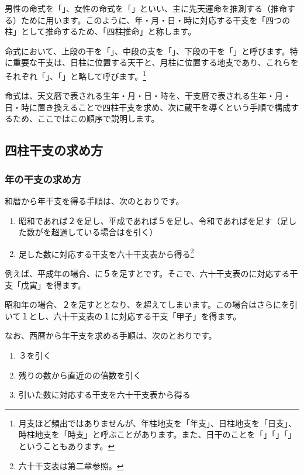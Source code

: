 \documentclass[a5paper,11pt,dvipdfmx]{tarticle}
\begin{document}
男性の命式を「」、女性の命式を「」といい、主に先天運命を推測する（推命する）ために用います。このように、年・月・日・時に対応する干支を「四つの柱」として推命するため、「四柱推命」と称します。

命式において、上段の干を「」、中段の支を「」、下段の干を「」と呼びます。特に重要な干支は、日柱に位置する天干と、月柱に位置する地支であり、これらをそれぞれ「」、「」と略して呼びます。\footnote{月支ほど頻出ではありませんが、年柱地支を「年支」、日柱地支を「日支」、時柱地支を「時支」と呼ぶことがあります。また、日干のことを「」「」「」ということもあります。}

命式は、天文暦で表される生年・月・日・時を、干支暦で表される生年・月・日・時に置き換えることで四柱干支を求め、次に蔵干を導くという手順で構成するため、ここではこの順序で説明します。

\clearpage

\subsection{四柱干支の求め方}
\subsubsection*{年の干支の求め方}

和暦から年干支を得る手順は、次のとおりです。

\begin{enumerate}
\item 昭和であれば２を足し、平成であれば５を足し、令和であればを足す（足した数がを超過している場合はを引く）
\item 足した数に対応する干支を六十干支表から得る\footnote{六十干支表は第二章参照。}
\end{enumerate}

例えば、平成年の場合、に５を足すとです。そこで、六十干支表のに対応する干支「戊寅」を得ます。

昭和年の場合、２を足すととなり、を超えてしまいます。この場合はさらにを引いて１とし、六十干支表の１に対応する干支「甲子」を得ます。

なお、西暦から年干支を求める手順は、次のとおりです。
\begin{enumerate}
\item ３を引く
\item 残りの数から直近のの倍数を引く
\item 引いた数に対応する干支を六十干支表から得る
\end{enumerate}
\end{document}
